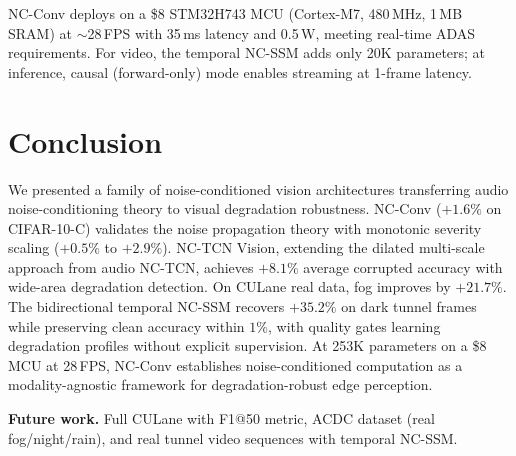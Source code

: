 \documentclass[runningheads]{llncs}
\begin{document}
NC-Conv deploys on a \$8 STM32H743 MCU (Cortex-M7, 480\,MHz, 1\,MB SRAM) at ${\sim}$28\,FPS with 35\,ms latency and 0.5\,W, meeting real-time ADAS requirements.
For video, the temporal NC-SSM adds only 20K parameters; at inference, causal (forward-only) mode enables streaming at 1-frame latency.


\section{Conclusion}
\label{sec:conclusion}

We presented a family of noise-conditioned vision architectures transferring audio noise-conditioning theory to visual degradation robustness.
NC-Conv ($+1.6\%$ on CIFAR-10-C) validates the noise propagation theory with monotonic severity scaling ($+0.5\%$ to $+2.9\%$).
NC-TCN Vision, extending the dilated multi-scale approach from audio NC-TCN, achieves $\mathbf{+8.1\%}$ average corrupted accuracy with wide-area degradation detection.
On CULane real data, fog improves by $+21.7\%$.
The bidirectional temporal NC-SSM recovers $+35.2\%$ on dark tunnel frames while preserving clean accuracy within $1\%$, with quality gates learning degradation profiles without explicit supervision.
At 253K parameters on a \$8 MCU at 28\,FPS, NC-Conv establishes noise-conditioned computation as a modality-agnostic framework for degradation-robust edge perception.

\noindent\textbf{Future work.}
Full CULane with F1@50 metric, ACDC dataset (real fog/night/rain), and real tunnel video sequences with temporal NC-SSM.




\end{document}

